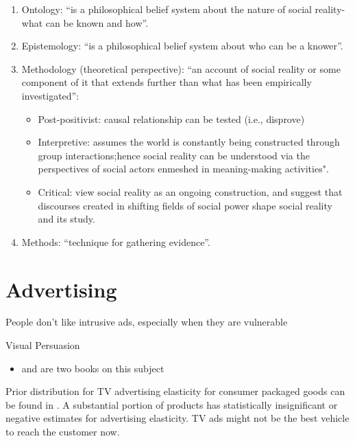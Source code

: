 \documentclass[
]{book}
\providecommand{\tightlist}{%
  \setlength{\itemsep}{0pt}\setlength{\parskip}{0pt}}
\begin{document}
\begin{enumerate}
\def\labelenumi{\arabic{enumi}.}
\item
  Ontology: ``is a philosophical belief system about the nature of social reality- what can be known and how''.\\
\item
  Epistemology: ``is a philosophical belief system about who can be a knower''.\\
\item
  Methodology (theoretical perspective): ``an account of social reality or some component of it that extends further
  than what has been empirically investigated'':

  \begin{itemize}
  \tightlist
  \item
    Post-positivist: causal relationship can be tested (i.e., disprove)\\
  \item
    Interpretive: assumes the world is constantly being constructed through group interactions;hence social reality
    can be understood via the perspectives of social actors enmeshed in meaning-making activities".\\
  \item
    Critical: view social reality as an ongoing construction, and suggest that discourses created in shifting fields
    of social power shape social reality and its study.\\
  \end{itemize}
\item
  Methods: ``technique for gathering evidence''.
\end{enumerate}

\hypertarget{advertising}{%
\chapter{Advertising}\label{advertising}}

People don't like intrusive ads, especially when they are vulnerable \citep[p.143]{kellogg_2005}

Visual Persuasion

\begin{itemize}
\tightlist
\item
  \citep{visualp1997} and \citep{visualp2003} are two books on this subject
\end{itemize}

Prior distribution for TV advertising elasticity for consumer packaged goods can be found in \citep{Shapiro_2018}. A substantial portion of products has statistically insignificant or negative estimates for advertising elasticity. TV ads might not be the best vehicle to reach the customer now.
\end{document}
